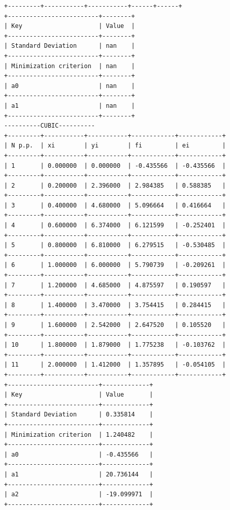 \documentclass[12pt,one column]{article}
\begin{document}
\begin{verbatim}
+---------+-----------+-----------+------+------+
+-------------------------+--------+
| Key                     | Value  | 
+-------------------------+--------+
| Standard Deviation      | nan    | 
+-------------------------+--------+
| Minimization criterion  | nan    | 
+-------------------------+--------+
| a0                      | nan    | 
+-------------------------+--------+
| a1                      | nan    | 
+-------------------------+--------+
----------CUBIC----------
+---------+-----------+-----------+------------+------------+
| N p.p.  | xi        | yi        | fi         | ei         | 
+---------+-----------+-----------+------------+------------+
| 1       | 0.000000  | 0.000000  | -0.435566  | -0.435566  | 
+---------+-----------+-----------+------------+------------+
| 2       | 0.200000  | 2.396000  | 2.984385   | 0.588385   | 
+---------+-----------+-----------+------------+------------+
| 3       | 0.400000  | 4.680000  | 5.096664   | 0.416664   | 
+---------+-----------+-----------+------------+------------+
| 4       | 0.600000  | 6.374000  | 6.121599   | -0.252401  | 
+---------+-----------+-----------+------------+------------+
| 5       | 0.800000  | 6.810000  | 6.279515   | -0.530485  | 
+---------+-----------+-----------+------------+------------+
| 6       | 1.000000  | 6.000000  | 5.790739   | -0.209261  | 
+---------+-----------+-----------+------------+------------+
| 7       | 1.200000  | 4.685000  | 4.875597   | 0.190597   | 
+---------+-----------+-----------+------------+------------+
| 8       | 1.400000  | 3.470000  | 3.754415   | 0.284415   | 
+---------+-----------+-----------+------------+------------+
| 9       | 1.600000  | 2.542000  | 2.647520   | 0.105520   | 
+---------+-----------+-----------+------------+------------+
| 10      | 1.800000  | 1.879000  | 1.775238   | -0.103762  | 
+---------+-----------+-----------+------------+------------+
| 11      | 2.000000  | 1.412000  | 1.357895   | -0.054105  | 
+---------+-----------+-----------+------------+------------+
+-------------------------+-------------+
| Key                     | Value       | 
+-------------------------+-------------+
| Standard Deviation      | 0.335814    | 
+-------------------------+-------------+
| Minimization criterion  | 1.240482    | 
+-------------------------+-------------+
| a0                      | -0.435566   | 
+-------------------------+-------------+
| a1                      | 20.736144   | 
+-------------------------+-------------+
| a2                      | -19.099971  | 
+-------------------------+-------------+

\end{verbatim}
\end{document}
